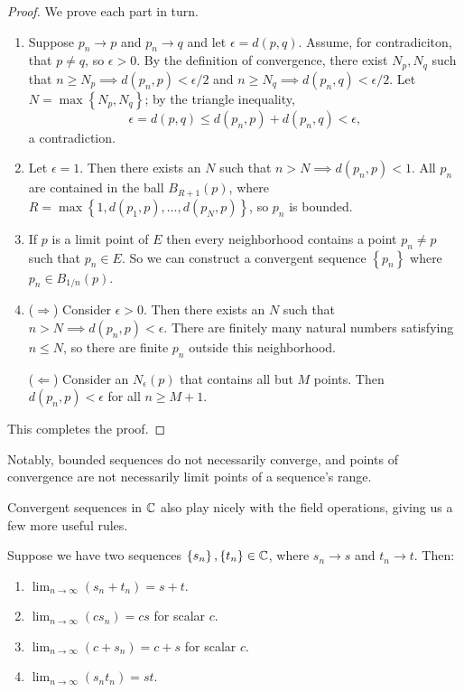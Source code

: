 \documentclass[../m131main.tex]{subfiles}
\begin{document}
\begin{proof}
    We prove each part in turn.
    \begin{enumerate}[label=(\alph*)]
        \item Suppose $p_n \to p$ and $p_n \to q$ and let $\epsilon = d(p,q)$.
        Assume, for contradiciton, that $p \neq q$, so $\epsilon > 0$.
        By the definition of convergence, there exist $N_p, N_q$ such that $n \geq N_p \implies d(p_n, p) < \epsilon / 2$ and $n \geq N_q \implies d(p_n, q) < \epsilon / 2$.
        Let $N = \max \left\{ N_p, N_q \right\}$; by the triangle inequality,
        \[ \epsilon = d(p,q) \leq d(p_n, p) + d(p_n, q) < \epsilon, \]
        a contradiction.

        \item Let $\epsilon = 1$.
        Then there exists an $N$ such that $n > N \implies d(p_n, p) < 1$.
        All $p_n$ are contained in the ball $B_{R+1}(p)$, where $R = \max \left\{ 1, d(p_1, p), \ldots, d(p_N, p) \right\}$, so $p_n$ is bounded.

        \item If $p$ is a limit point of $E$ then every neighborhood contains a point $p_n \neq p$ such that $p_n \in E$.
        So we can construct a convergent sequence $\left\{ p_n \right\}$ where $p_n \in B_{1 / n}(p)$.

        \item ($\Rightarrow$)
        Consider $\epsilon > 0$.
        Then there exists an $N$ such that $n > N \implies d(p_n, p) < \epsilon$.
        There are finitely many natural numbers satisfying $n \leq N$, so there are finite $p_n$ outside this neighborhood.

        ($\Leftarrow$)
        Consider an $N_\epsilon (p)$ that contains all but $M$ points.
        Then $d(p_n, p) < \epsilon$ for all $n \geq M + 1$.
    \end{enumerate}
    This completes the proof.
\end{proof}

Notably, bounded sequences do not necessarily converge, and points of convergence are not necessarily limit points of a sequence's range.

Convergent sequences in $\mathbb{C}$ also play nicely with the field operations, giving us a few more useful rules.

\begin{theorem}
    Suppose we have two sequences $\left\{ s_n \right\}, \left\{ t_n \right\} \in \mathbb{C}$, where $s_n \to s$ and $t_n \to t$.
    Then:
    \begin{enumerate}[label=(\alph*)]
        \item $\lim_{n \to \infty} (s_n + t_n) = s + t$.
        \item $\lim_{n \to \infty} (cs_n) = cs$ for scalar $c$. 
        \item $\lim_{n \to \infty} (c + s_n) = c + s$ for scalar $c$.
        \item $\lim_{n \to \infty} (s_n t_n) = st$.
    \end{enumerate}
\end{theorem}
\end{document}
